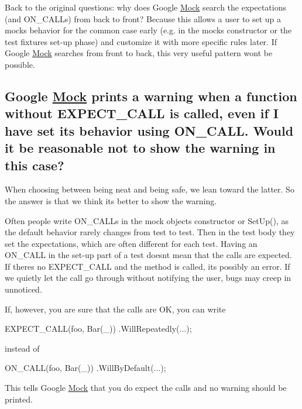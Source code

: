 Back to the original questions\+: why does Google \hyperlink{class_mock}{Mock} search the expectations (and {\ttfamily O\+N\+\_\+\+C\+A\+LL}s) from back to front? Because this allows a user to set up a mock\textquotesingle{}s behavior for the common case early (e.\+g. in the mock\textquotesingle{}s constructor or the test fixture\textquotesingle{}s set-\/up phase) and customize it with more specific rules later. If Google \hyperlink{class_mock}{Mock} searches from front to back, this very useful pattern won\textquotesingle{}t be possible.

\subsection*{Google \hyperlink{class_mock}{Mock} prints a warning when a function without E\+X\+P\+E\+C\+T\+\_\+\+C\+A\+LL is called, even if I have set its behavior using O\+N\+\_\+\+C\+A\+LL. Would it be reasonable not to show the warning in this case?}

When choosing between being neat and being safe, we lean toward the latter. So the answer is that we think it\textquotesingle{}s better to show the warning.

Often people write {\ttfamily O\+N\+\_\+\+C\+A\+LL}s in the mock object\textquotesingle{}s constructor or {\ttfamily Set\+Up()}, as the default behavior rarely changes from test to test. Then in the test body they set the expectations, which are often different for each test. Having an {\ttfamily O\+N\+\_\+\+C\+A\+LL} in the set-\/up part of a test doesn\textquotesingle{}t mean that the calls are expected. If there\textquotesingle{}s no {\ttfamily E\+X\+P\+E\+C\+T\+\_\+\+C\+A\+LL} and the method is called, it\textquotesingle{}s possibly an error. If we quietly let the call go through without notifying the user, bugs may creep in unnoticed.

If, however, you are sure that the calls are OK, you can write


\begin{DoxyCode}
EXPECT\_CALL(foo, Bar(\_))
    .WillRepeatedly(...);
\end{DoxyCode}


instead of


\begin{DoxyCode}
ON\_CALL(foo, Bar(\_))
    .WillByDefault(...);
\end{DoxyCode}


This tells Google \hyperlink{class_mock}{Mock} that you do expect the calls and no warning should be printed.

